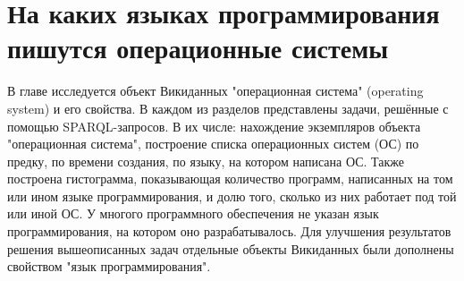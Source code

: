 \chapter{На каких языках программирования пишутся операционные системы}
\label{ch:operating-systems}

В главе исследуется объект Викиданных "операционная система" (operating system) и его свойства. В каждом из разделов представлены задачи, решённые с помощью SPARQL-запросов. В их числе: нахождение экземпляров объекта "операционная система", построение списка операционных систем (ОС) по предку, по времени создания, по языку, на котором написана ОС. Также построена гистограмма, показывающая количество программ, написанных на том или ином языке программирования, и долю того, сколько из них работает под той или иной ОС. У многого программного обеспечения не указан язык программирования, на котором оно разрабатывалось. Для улучшения результатов решения вышеописанных задач отдельные объекты Викиданных были дополнены свойством "язык программирования".
